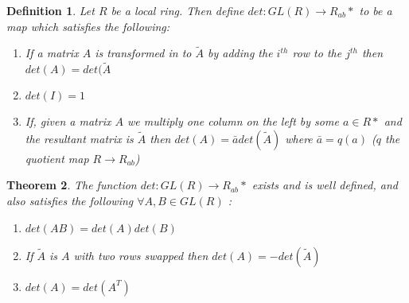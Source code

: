 \documentclass[a4paper,10pt]{article}
\newtheorem{thm}{Theorem}[subsection]
\newtheorem{defn}[thm]{Definition}
\begin{document}
\begin{defn}
Let $R$ be a local ring. Then define $det:GL(R)\rightarrow R_{ab}*$ to be a map which satisfies the following:
\begin{enumerate}
 \item If a matrix $A$ is transformed in to $\tilde{A}$ by adding the $i^{th}$ row to the $j^{th}$ then $det(A)=det(\tilde{A}$
 \item $det(I)=1$
 \item If, given a matrix $A$ we multiply one column on the left by some $a\in R*$ and the resultant matrix is $\tilde{A}$ then $det(A)=\bar{a}det(\tilde{A})$ where $\bar{a}=q(a)$ ($q$ the quotient map $R\rightarrow R_{ab}$)

\end{enumerate}

\end{defn}

\begin{thm}
The function $det:GL(R)\rightarrow R_{ab}*$ exists and is well defined, and also satisfies the following $\forall A,B\in GL(R)$  :
\begin{enumerate}
 \item $det(AB)=det(A)det(B)$
 \item If $\tilde{A}$ is $A$ with two rows swapped then $det(A)=-det(\tilde{A})$
 \item $det(A)=det(A^{T})$
\end{enumerate}
\end{thm}
\end{document}
